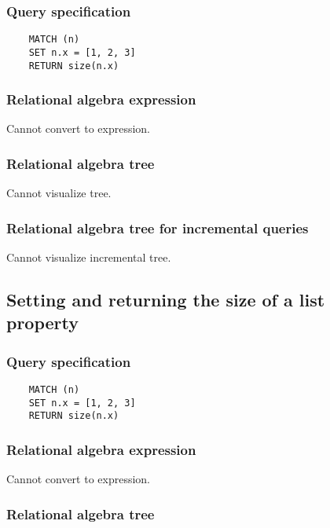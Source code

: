 	\subsubsection*{Query specification}

	\begin{lstlisting}
	MATCH (n)
	SET n.x = [1, 2, 3]
	RETURN size(n.x)
	\end{lstlisting}


	\subsubsection*{Relational algebra expression}

	Cannot convert to expression.

	\subsubsection*{Relational algebra tree}

	Cannot visualize tree.

	\subsubsection*{Relational algebra tree for incremental queries}

	Cannot visualize incremental tree.
	\subsection{Setting and returning the size of a list property}

	\subsubsection*{Query specification}

	\begin{lstlisting}
	MATCH (n)
	SET n.x = [1, 2, 3]
	RETURN size(n.x)
	\end{lstlisting}


	\subsubsection*{Relational algebra expression}

	Cannot convert to expression.

	\subsubsection*{Relational algebra tree}

